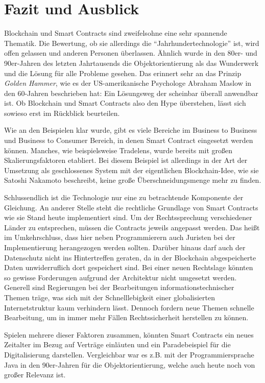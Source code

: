 \chapter{Fazit und Ausblick}
\label{chap:FazitUndAusblick}
Blockchain und Smart Contracts sind zweifelsohne eine sehr spannende Thematik. Die Bewertung, ob sie allerdings die \enquote{Jahrhundertechnologie} ist, wird offen gelassen und anderen Personen überlassen. Ähnlich wurde in den 80er- und 90er-Jahren des letzten Jahrtausends die Objektorientierung als das Wunderwerk und die Lösung für alle Probleme gesehen. Das erinnert sehr an das Prinzip \emph{Golden Hammer}, wie es der US-amerikanische Psychologe Abraham Maslow in den 60-Jahren beschrieben hat: Ein Lösungsweg der scheinbar überall anwendbar ist. Ob Blockchain und Smart Contracts also den Hype überstehen, lässt sich sowieso erst im Rückblick beurteilen.

Wie an den Beispielen klar wurde, gibt es viele Bereiche im Business to Business und Business to Consumer Bereich, in denen Smart Contract eingesetzt werden können. Manches, wie beispielsweise Tradelens, wurde bereits mit großen Skalierungsfaktoren etabliert. Bei diesem Beispiel ist allerdings in der Art der Umsetzung als geschlossenes System mit der eigentlichen Blockchain-Idee, wie sie Satoshi Nakamoto beschreibt, keine große Überschneidungsmenge mehr zu finden.

Schlussendlich ist die Technologie nur eine zu betrachtende Komponente der Gleichung. An anderer Stelle steht die rechtliche Grundlage von Smart Contracts wie sie Stand heute implementiert sind. Um der Rechtssprechung verschiedener Länder zu entsprechen, müssen die Contracts jeweils angepasst werden. Das heißt im Umkehrschluss, dass hier neben Programmierern auch Juristen bei der Implementierung herangezogen werden sollten. Darüber hinaus darf auch der Datenschutz nicht ins Hintertreffen geraten, da in der Blockchain abgespeicherte Daten unwiderruflich dort gespeichert sind. Bei einer neuen Rechtslage könnten so gewisse Forderungen aufgrund der Architektur nicht umgesetzt werden. Generell sind Regierungen bei der Bearbeitungen informationstechnischer Themen träge, was sich mit der Schnelllebigkeit einer globalisierten Internetstruktur kaum verhindern lässt. Dennoch fordern neue Themen schnelle Bearbeitung, um in immer mehr Fällen Rechtssicherheit herstellen zu können.

Spielen mehrere dieser Faktoren zusammen, könnten Smart Contracts ein neues Zeitalter im Bezug auf Verträge einläuten und ein Paradebeispiel für die Digitalisierung darstellen. Vergleichbar war es z.B. mit der Programmiersprache Java in den 90er-Jahren für die Objektorientierung, welche auch heute noch von großer Relevanz ist.